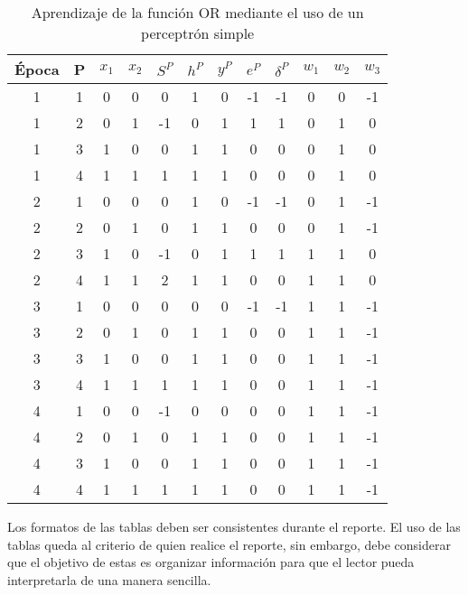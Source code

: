\begin{table}[!htbp]
\begin{center}
\caption{Aprendizaje de la función OR mediante el uso de un perceptrón simple} \label{tabla2}
\begin{footnotesize}
\begin{tabular}{|c|c|c|c|c|c|c|c|c|c|c|c|}\hline
Época & P & $x_1$ & $x_2$ & $S^P$ & $h^P$ & $y^P$ & $e^P$ & $\delta^P$ & $w_1$ & $w_2$ & $w_3$ \\ \hline
  1 & 1 & 0 & 0 & 0  & 1 & 0 & -1 & -1 & 0 & 0 & -1 \\
  1 & 2 & 0 & 1 & -1 & 0 & 1 & 1  & 1  & 0 & 1 & 0 \\
  1 & 3 & 1 & 0 & 0  & 1 & 1 & 0  & 0  & 0 & 1 & 0 \\
  1 & 4 & 1 & 1 & 1  & 1 & 1 & 0  & 0  & 0 & 1 & 0 \\\hline
  2 & 1 & 0 & 0 & 0  & 1 & 0 & -1 & -1 & 0 & 1 & -1 \\
  2 & 2 & 0 & 1 & 0  & 1 & 1 & 0  & 0  & 0 & 1 & -1 \\
  2 & 3 & 1 & 0 & -1 & 0 & 1 & 1  & 1  & 1 & 1 & 0 \\
  2 & 4 & 1 & 1 & 2  & 1 & 1 & 0  & 0  & 1 & 1 & 0 \\\hline
  3 & 1 & 0 & 0 & 0  & 0 & 0 & -1 & -1 & 1 & 1 & -1 \\
  3 & 2 & 0 & 1 & 0  & 1 & 1 & 0  & 0  & 1 & 1 & -1 \\
  3 & 3 & 1 & 0 & 0  & 1 & 1 & 0  & 0  & 1 & 1 & -1 \\
  3 & 4 & 1 & 1 & 1  & 1 & 1 & 0  & 0  & 1 & 1 & -1 \\\hline
  4 & 1 & 0 & 0 & -1 & 0 & 0 & 0  & 0  & 1 & 1 & -1 \\
  4 & 2 & 0 & 1 & 0  & 1 & 1 & 0  & 0  & 1 & 1 & -1 \\
  4 & 3 & 1 & 0 & 0  & 1 & 1 & 0  & 0  & 1 & 1 & -1 \\
  4 & 4 & 1 & 1 & 1  & 1 & 1 & 0  & 0  & 1 & 1 & -1 \\
  \hline
\end{tabular}
\end{footnotesize}
\end{center}
\end{table}


Los formatos de las tablas deben ser consistentes durante el reporte. El uso de las tablas queda al criterio de quien realice el reporte, sin embargo, debe considerar que el objetivo de estas es organizar información para que el lector pueda interpretarla de una manera sencilla.  